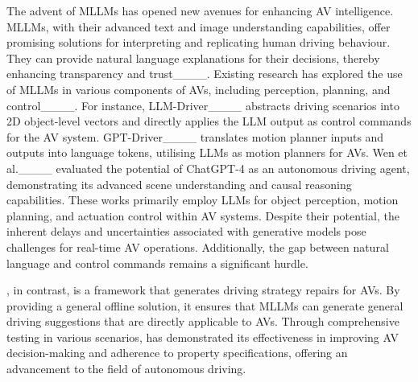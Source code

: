 The advent of MLLMs has opened new avenues for enhancing AV intelligence. MLLMs, with their advanced text and image understanding capabilities, offer promising solutions for interpreting and replicating human driving behaviour. They can provide natural language explanations for their decisions, thereby enhancing transparency and trust____. Existing research has explored the use of MLLMs in various components of AVs, including perception, planning, and control____. For instance, LLM-Driver____ abstracts driving scenarios into 2D object-level vectors and directly applies the LLM output as control commands for the AV system. GPT-Driver____ translates motion planner inputs and outputs into language tokens, utilising LLMs as motion planners for AVs. Wen et al.____ evaluated the potential of ChatGPT-4 as an autonomous driving agent, demonstrating its advanced scene understanding and causal reasoning capabilities. 
These works primarily employ LLMs for object perception, motion planning, and actuation control within AV systems. Despite their potential, the inherent delays and uncertainties associated with generative models pose challenges for real-time AV operations. Additionally, the gap between natural language and control commands remains a significant hurdle.


\coolname, in contrast, is a framework that generates driving strategy repairs for AVs. By providing a general offline solution, it ensures that MLLMs can generate general driving suggestions that are directly applicable to AVs. Through comprehensive testing in various scenarios, \coolname has demonstrated its effectiveness in improving AV decision-making and adherence to property specifications, offering an advancement to the field of autonomous driving.